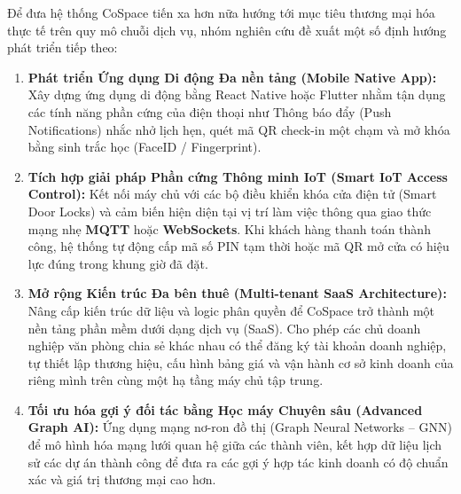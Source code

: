Để đưa hệ thống CoSpace tiến xa hơn nữa hướng tới mục tiêu thương mại hóa thực tế trên quy mô chuỗi dịch vụ, nhóm nghiên cứu đề xuất một số định hướng phát triển tiếp theo:

\begin{enumerate}
    \item \textbf{Phát triển Ứng dụng Di động Đa nền tảng (Mobile Native App):} Xây dựng ứng dụng di động bằng React Native hoặc Flutter nhằm tận dụng các tính năng phần cứng của điện thoại như Thông báo đẩy (Push Notifications) nhắc nhở lịch hẹn, quét mã QR check-in một chạm và mở khóa bằng sinh trắc học (FaceID / Fingerprint).
    \item \textbf{Tích hợp giải pháp Phần cứng Thông minh IoT (Smart IoT Access Control):} Kết nối máy chủ với các bộ điều khiển khóa cửa điện tử (Smart Door Locks) và cảm biến hiện diện tại vị trí làm việc thông qua giao thức mạng nhẹ \textbf{MQTT} hoặc \textbf{WebSockets}. Khi khách hàng thanh toán thành công, hệ thống tự động cấp mã số PIN tạm thời hoặc mã QR mở cửa có hiệu lực đúng trong khung giờ đã đặt.
    \item \textbf{Mở rộng Kiến trúc Đa bên thuê (Multi-tenant SaaS Architecture):} Nâng cấp kiến trúc dữ liệu và logic phân quyền để CoSpace trở thành một nền tảng phần mềm dưới dạng dịch vụ (SaaS). Cho phép các chủ doanh nghiệp văn phòng chia sẻ khác nhau có thể đăng ký tài khoản doanh nghiệp, tự thiết lập thương hiệu, cấu hình bảng giá và vận hành cơ sở kinh doanh của riêng mình trên cùng một hạ tầng máy chủ tập trung.
    \item \textbf{Tối ưu hóa gợi ý đối tác bằng Học máy Chuyên sâu (Advanced Graph AI):} Ứng dụng mạng nơ-ron đồ thị (Graph Neural Networks -- GNN) để mô hình hóa mạng lưới quan hệ giữa các thành viên, kết hợp dữ liệu lịch sử các dự án thành công để đưa ra các gợi ý hợp tác kinh doanh có độ chuẩn xác và giá trị thương mại cao hơn.
\end{enumerate}